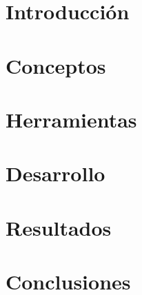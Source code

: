 \documentclass[12pt, a4paper, twoside]{article}
\begin{document}


\clearpage
\setcounter{page}{1}



\newpage



\newpage



\tableofcontents

\section{Introducción}


\section{Conceptos}


\section{Herramientas}


\section{Desarrollo}


\section{Resultados}


\section{Conclusiones}


\nocite{*}
\printbibliography

\newpage

\begin{umaappendices}


\end{umaappendices}

\newpage


\end{document}
